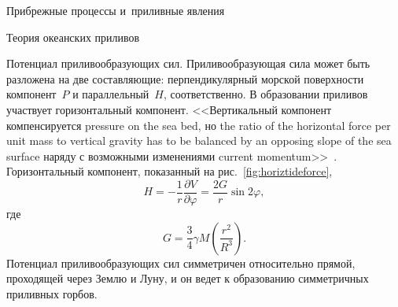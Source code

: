 \begin{chapter}{Прибрежные процессы и~приливные явления}
\begin{section}{Теория океанских приливов}
\begin{paragraph}{Потенциал приливообразующих сил.}
Приливообразующая сила может быть разложена на две составляющие:
перпендикулярный морской поверхности компонент~$P$ и параллельный~$H$,
соответственно. В образовании приливов участвует горизонтальный компонент.
<<Вертикальный компонент компенсируется
pressure on the sea bed, но the ratio of the horizontal
force per unit mass to vertical gravity has to be balanced by an
opposing slope of the sea surface наряду с возможными изменениями
current momentum>>~\cite[стр.~39, 45]{Cartwright:1999}. 
Горизонтальный компонент, показанный на рис.~\ref{fig:horiztideforce},
\begin{equation}
 H = - \frac{1}{r} \frac{\partial V}{\partial\varphi} 
   = \frac{2 G}{r} \sin 2\varphi,
\end{equation}
где
\begin{equation}
 G = \frac{3}{4} \gamma M \left( \frac{r^{2}}{R^{3}} \right).
\end{equation}
Потенциал приливообразующих сил симметричен относительно прямой, проходящей
через Землю и Луну, и он ведет к образованию симметричных приливных
горбов.
%


\end{paragraph}
\end{section}
\end{chapter}
